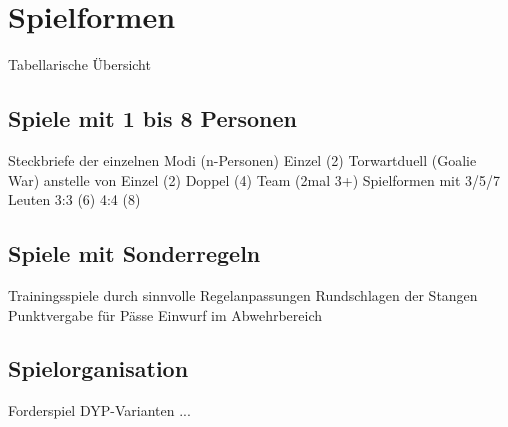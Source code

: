 \chapter{Spielformen}

 Tabellarische Übersicht

\section{Spiele mit 1 bis 8 Personen}
Steckbriefe der einzelnen Modi (n-Personen)
Einzel (2)
Torwartduell (Goalie War) anstelle von Einzel (2)
Doppel (4)
Team (2mal 3+)
Spielformen mit 3/5/7 Leuten
3:3 (6)
4:4 (8)

\section{Spiele mit Sonderregeln}
Trainingsspiele durch sinnvolle Regelanpassungen
Rundschlagen der Stangen
Punktvergabe für Pässe
Einwurf im Abwehrbereich

\section{Spielorganisation}
Forderspiel
DYP-Varianten
...

